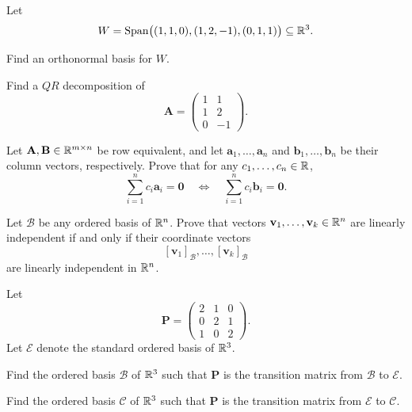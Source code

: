 \begin{problem}
Let
\[
W=\operatorname{Span}\bigl((1,1,0),(1,2,-1),(0,1,1)\bigr)\subseteq\mathbb{R}^3.
\]
\begin{problemsubparts}
\item Find an orthonormal basis for $W$.
\item Find a $QR$ decomposition of
\[
\mathbf A=
\begin{pmatrix}
1&1\\
1&2\\
0&-1
\end{pmatrix}.
\]
\end{problemsubparts}
\end{problem}

\begin{problem}
Let $\mathbf A,\mathbf B\in\mathbb{R}^{m\times n}$ be row equivalent, and let $\mathbf a_1,\dots,\mathbf a_n$ and $\mathbf b_1,\dots,\mathbf b_n$ be their column vectors, respectively. Prove that for any $c_1,\dots,c_n\in\mathbb{R}$,
\[
\sum_{i=1}^n c_i\mathbf a_i=\mathbf0
\quad\Longleftrightarrow\quad
\sum_{i=1}^n c_i\mathbf b_i=\mathbf0.
\]
\end{problem}

\begin{problem}
Let $\mathcal B$ be any ordered basis of $\mathbb{R}^n$. Prove that vectors $\mathbf v_1,\dots,\mathbf v_k\in\mathbb{R}^n$ are linearly independent if and only if their coordinate vectors
\[
[\mathbf v_1]_{\mathcal B},\dots,[\mathbf v_k]_{\mathcal B}
\]
are linearly independent in $\mathbb{R}^n$.
\end{problem}

\begin{problem}
Let
\[
\mathbf P=
\begin{pmatrix}
2&1&0\\
0&2&1\\
1&0&2
\end{pmatrix}.
\]
Let $\mathcal E$ denote the standard ordered basis of $\mathbb{R}^3$.
\begin{problemsubparts}
\item Find the ordered basis $\mathcal B$ of $\mathbb{R}^3$ such that $\mathbf P$ is the transition matrix from $\mathcal B$ to $\mathcal E$.
\item Find the ordered basis $\mathcal C$ of $\mathbb{R}^3$ such that $\mathbf P$ is the transition matrix from $\mathcal E$ to $\mathcal C$.
\end{problemsubparts}
\end{problem}

